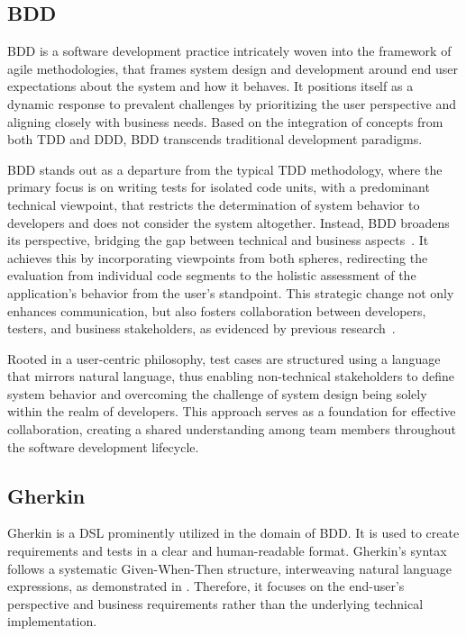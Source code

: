 \label{sec:background}
\subsection{\acl{BDD}}
\label{subsec:bdd}
\acf{BDD} is a software development practice intricately woven into the framework of agile methodologies, that frames system design and development around end user expectations about the system and how it behaves. It positions itself as a dynamic response to prevalent challenges by prioritizing the user perspective and aligning closely with business needs. Based on the integration of concepts from both \ac{TDD} and \ac{DDD}, \ac{BDD} transcends traditional development paradigms.

\ac{BDD} stands out as a departure from the typical \ac{TDD} methodology, where the primary focus is on writing tests for isolated code units, with a predominant technical viewpoint, that restricts the determination of system behavior to developers and does not consider the system altogether. Instead, \ac{BDD} broadens its perspective, bridging the gap between technical and business aspects~\cite{Farooq2023bdd,Binamungu2020bdd}. It achieves this by incorporating viewpoints from both spheres, redirecting the evaluation from individual code segments to the holistic assessment of the application's behavior from the user's standpoint. This strategic change not only enhances communication, but also fosters collaboration between developers, testers, and business stakeholders, as evidenced by previous research~\cite{smart2023bdd,pereira2018behavior}.

Rooted in a user-centric philosophy, test cases are structured using a language that mirrors natural language, thus enabling non-technical stakeholders to define system behavior and overcoming the challenge of system design being solely within the realm of developers. This approach serves as a foundation for effective collaboration, creating a shared understanding among team members throughout the software development lifecycle.

\subsection{Gherkin}
\label{subsec:gherkin}

Gherkin is a \acf{DSL} prominently utilized in the domain of \ac{BDD}. It is used to create requirements and tests in a clear and human-readable format. Gherkin's syntax follows a systematic Given-When-Then structure, interweaving natural language expressions, as demonstrated in . Therefore, it focuses on the end-user's perspective and business requirements rather than the underlying technical implementation.

